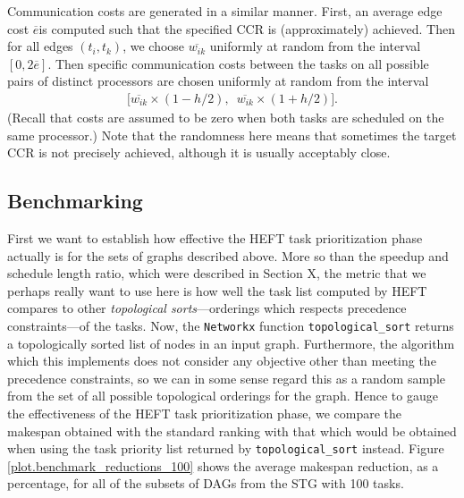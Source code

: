 \documentclass[12pt]{article}
\begin{document}

Communication costs are generated in a similar manner. First, an average edge cost $\overline{e} $is computed such that the specified CCR is (approximately) achieved. Then for all edges $(t_i, t_k)$, we choose $\overline{w_{ik}}$ uniformly at random from the interval $[0, 2\overline{e}]$. Then specific communication costs between the tasks on all possible pairs of distinct processors are chosen uniformly at random from the interval    
\begin{align*}
\big[ \overline{w_{ik}} \times (1 - h/2), \enspace \overline{w_{ik}} \times (1 + h/2)   \big].
\end{align*} 
(Recall that costs are assumed to be zero when both tasks are scheduled on the same processor.) Note that the randomness here means that sometimes the target CCR is not precisely achieved, although it is usually acceptably close.


\subsection{Benchmarking}
\label{subsect.benchmarking}

First we want to establish how effective the HEFT task prioritization phase actually is for the sets of graphs described above. More so than the speedup and schedule length ratio, which were described in Section X, the metric that we perhaps really want to use here is how well the task list computed by HEFT compares to other {\em topological sorts}---orderings which respects precedence constraints---of the tasks. Now, the {\tt Networkx} function {\tt topological\_sort} returns a topologically sorted list of nodes in an input graph. Furthermore, the algorithm which this implements does not consider any objective other than meeting the precedence constraints, so we can in some sense regard this as a random sample from the set of all possible topological orderings for the graph. Hence to gauge the effectiveness of the HEFT task prioritization phase, we compare the makespan obtained with the standard ranking with that which would be obtained when using the task priority list returned by {\tt topological\_sort} instead. Figure \ref{plot.benchmark_reductions_100} shows the average makespan reduction, as a percentage, for all of the subsets of DAGs from the STG with 100 tasks.
\end{document}
